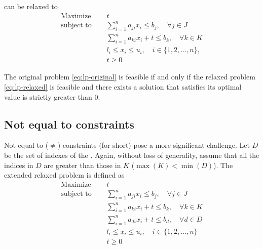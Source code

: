 \documentclass[runningheads]{llncs}
\begin{document}
can be relaxed to
\begin{equation}
    \label{eq:lp-relaxed}
    \begin{split}
        \text{Maximize }   \quad & t                                                             \\
        \text{subject to } \quad & \sum_{i=1}^{n} a_{ji}x_{i} \le b_j, \quad \forall j \in J     \\
        \quad                    & \sum_{i=1}^{n} a_{ki}x_{i} + t \le b_k, \quad \forall k \in K \\
        & l_i \le x_i \le u_i,  \quad i \in \{1, 2, \ldots, n\},        \\
        & t \ge 0
    \end{split}
\end{equation}

\begin{theorem}
    \label{thm:lp-relaxed}
    The original problem \eqref{eq:lp-original} is feasible if and only if the relaxed problem \eqref{eq:lp-relaxed} is feasible and there exists a solution that satisfies its optimal value is strictly greater than $0$.
\end{theorem}

\subsection{Not equal to constraints}

Not equal to ($\ne$) constraints (\nqcs for short) pose a more significant challenge.
Let $D$ be the set of indexes of the \nqcs.
Again, without loss of generality, assume that all the indices in $D$ are greater than those in $K$ ($\max(K) < \min(D)$).
The extended relaxed problem is defined as
\begin{equation}
    \label{eq:lp-extended}
    \begin{split}
        \text{Maximize }   \quad & t                                                             \\
        \text{subject to } \quad & \sum_{i=1}^{n} a_{ji}x_{i} \le b_j, \quad \forall j \in J     \\
        \quad                    & \sum_{i=1}^{n} a_{ki}x_{i} + t \le b_k, \quad \forall k \in K \\
        \quad                    & \sum_{i=1}^{n} a_{di}x_{i} + t \le b_d, \quad \forall d \in D \\
        & l_i \le x_i \le u_i,  \quad i \in \{1, 2, \ldots, n\}         \\
        & t \ge 0
    \end{split}
\end{equation}
\end{document}
